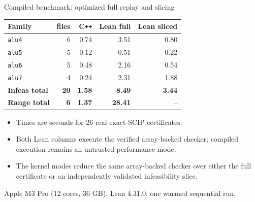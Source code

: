 \documentclass[aspectratio=169,11pt]{beamer}
\newcommand{\scip}{\textsc{SCIP}}
\newcommand{\code}[1]{\texttt{#1}}
\begin{document}
\begin{frame}{Compiled benchmark: optimized full replay and slicing}
  \scriptsize
  \begin{center}
  \begin{tabular}{@{}lrrrr@{}}
    \toprule
    Family & files & C\texttt{++} & Lean full & Lean sliced \\
    \midrule
    \code{alu4} & 6 & 0.74 & 3.51 & 0.80 \\
    \code{alu5} & 5 & 0.12 & 0.51 & 0.22 \\
    \code{alu6} & 5 & 0.48 & 2.16 & 0.54 \\
    \code{alu7} & 4 & 0.24 & 2.31 & 1.88 \\
    \midrule
    \textbf{Infeas total} & \textbf{20} & \textbf{1.58} &
      \textbf{8.49} & \textbf{3.44} \\
    \textbf{Range total} & \textbf{6} & \textbf{1.37} &
      \textbf{28.41} & -- \\
    \bottomrule
  \end{tabular}
  \end{center}

  \vspace{0.5em}
  \begin{itemize}
    \item Times are seconds for 26 real exact-\scip{} certificates.
    \item Both Lean columns execute the verified array-backed checker; compiled
          execution remains an untrusted performance mode.
    \item The kernel modes reduce the same array-backed checker over either the full
          certificate or an independently validated infeasibility slice.
  \end{itemize}

  \vspace{0.2em}
  \centering
  \tiny Apple M3 Pro (12 cores, 36 GB), Lean 4.31.0; one warmed sequential run.
\end{frame}
\end{document}
